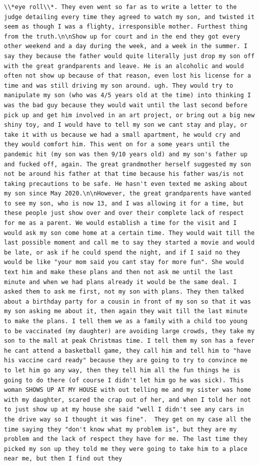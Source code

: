 \documentclass[
  letterpaper,
  DIV=11,
  numbers=noendperiod]{scrreprt}
\begin{document}
\begin{verbatim}
\\*eye roll\\*. They even went so far as to write a letter to the judge detailing every time they agreed to watch my son, and twisted it seem as though I was a flighty, irresponsible mother. Furthest thing from the truth.\n\nShow up for court and in the end they got every other weekend and a day during the week, and a week in the summer. I say they because the father would quite literally just drop my son off with the great grandparents and leave. He is an alcoholic and would often not show up because of that reason, even lost his license for a time and was still driving my son around. ugh. They would try to manipulate my son (who was 4/5 years old at the time) into thinking I was the bad guy because they would wait until the last second before pick up and get him involved in an art project, or bring out a big new shiny toy, and I would have to tell my son we cant stay and play, or take it with us because we had a small apartment, he would cry and they would comfort him. This went on for a some years until the pandemic hit (my son was then 9/10 years old) and my son's father up and fucked off, again. The great grandmother herself suggested my son not be around his father at that time because his father was/is not taking precautions to be safe. He hasn't even texted me asking about my son since May 2020.\n\nHowever, the great grandparents have wanted to see my son, who is now 13, and I was allowing it for a time, but these people just show over and over their complete lack of respect for me as a parent. We would establish a time for the visit and I would ask my son come home at a certain time. They would wait till the last possible moment and call me to say they started a movie and would be late, or ask if he could spend the night, and if I said no they would be like "your mom said you cant stay for more fun". She would text him and make these plans and then not ask me until the last minute and when we had plans already it would be the same deal. I asked them to ask me first, not my son with plans. They then talked about a birthday party for a cousin in front of my son so that it was my son asking me about it, then again they wait till the last minute to make the plans. I tell them we as a family with a child too young to be vaccinated (my daughter) are avoiding large crowds, they take my son to the mall at peak Christmas time. I tell them my son has a fever he cant attend a basketball game, they call him and tell him to "have his vaccine card ready" because they are going to try to convince me to let him go any way, then they tell him all the fun things he is going to do there (of course I didn't let him go he was sick). This woman SHOWS UP AT MY HOUSE with out telling me and my sister was home with my daughter, scared the crap out of her, and when I told her not to just show up at my house she said "well I didn't see any cars in the drive way so I thought it was fine".  They get on my case all the time saying they "don't know what my problem is", but they are my problem and the lack of respect they have for me. The last time they picked my son up they told me they were going to take him to a place near me, but then I find out they 
\end{verbatim}
\end{document}
